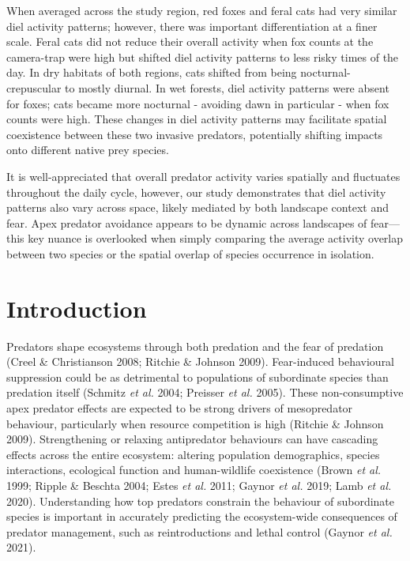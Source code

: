 \documentclass[11pt,a4paper,titlepage,twoside,openright]{style/unimelbthesis}
\begin{document}
\begin{mainmatter}
When averaged across the study region, red foxes and feral cats had very similar diel activity patterns; however, there was important differentiation at a finer scale. Feral cats did not reduce their overall activity when fox counts at the camera-trap were high but shifted diel activity patterns to less risky times of the day. In dry habitats of both regions, cats shifted from being nocturnal-crepuscular to mostly diurnal. In wet forests, diel activity patterns were absent for foxes; cats became more nocturnal - avoiding dawn in particular - when fox counts were high. These changes in diel activity patterns may facilitate spatial coexistence between these two invasive predators, potentially shifting impacts onto different native prey species.

It is well-appreciated that overall predator activity varies spatially and fluctuates throughout the daily cycle, however, our study demonstrates that diel activity patterns also vary across space, likely mediated by both landscape context and fear. Apex predator avoidance appears to be dynamic across landscapes of fear--- this key nuance is overlooked when simply comparing the average activity overlap between two species or the spatial overlap of species occurrence in isolation.

\newpage

\hypertarget{introduction-3}{%
\section{Introduction}\label{introduction-3}}

Predators shape ecosystems through both predation and the fear of predation (Creel \& Christianson 2008; Ritchie \& Johnson 2009). Fear-induced behavioural suppression could be as detrimental to populations of subordinate species than predation itself (Schmitz \emph{et al.} 2004; Preisser \emph{et al.} 2005). These non-consumptive apex predator effects are expected to be strong drivers of mesopredator behaviour, particularly when resource competition is high (Ritchie \& Johnson 2009). Strengthening or relaxing antipredator behaviours can have cascading effects across the entire ecosystem: altering population demographics, species interactions, ecological function and human-wildlife coexistence (Brown \emph{et al.} 1999; Ripple \& Beschta 2004; Estes \emph{et al.} 2011; Gaynor \emph{et al.} 2019; Lamb \emph{et al.} 2020). Understanding how top predators constrain the behaviour of subordinate species is important in accurately predicting the ecosystem-wide consequences of predator management, such as reintroductions and lethal control (Gaynor \emph{et al.} 2021).


\end{mainmatter}
\end{document}
